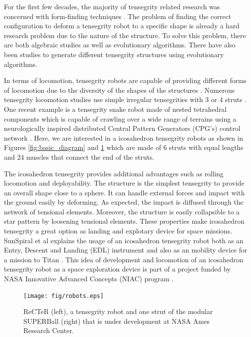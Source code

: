\documentclass[twocolumn,10pt]{asme2ej}
\begin{document}
For the first few decades, the majority of tensegrity related research was concerned with form-finding techniques \cite{Force_Density, Algebraic_form, Review_form_finding,Rieffel:2009:ADO:1507770.1507951, Nonregular_form_finding,Paul:2005:EFT:1068009.1068011,pugh1976introduction}.
The problem of finding the correct configuration to deform a tensegrity robot to a specific shape is already a hard research problem due to the nature of the structure. To solve this problem, there are both algebraic studies as well as evolutionary algorithms. There have also been studies to generate different tensegrity structures using evolutionary algorithms.

In terms of locomotion, tensegrity robots are capable of providing different forms of locomotion due to the diversity of the shapes of the structures \cite{fujiia2006movement}.  Numerous tensegrity locomotion studies use simple irregular tensegrities with 3 or 4 struts \cite{paul2006design,paul2005gait}.  One recent example is a tensegrity snake robot made of nested tetrahedral components which is capable of crawling over a wide range of terrains using a neurologically inspired distributed Central Pattern Generators (CPG's) control network \cite{Tietz2013}.  Here, we are interested in a icosahedron tensegrity robots as shown in Figures \ref{fig:basic_diagram} and \ref{fig:robots} which are made of 6 struts with equal lengths and 24 muscles that connect the end of the struts.

The icosahedron tensegrity provides additional advantages such as rolling locomotion and deployability. The structure is the simplest tensegrity to provide an overall shape close to a sphere. It can handle external forces and impact with the ground easily by deforming. As expected, the impact is diffused through the network of tensional elements. Moreover, the structure is easily collapsible to a star pattern by loosening tensional elements. These properties make icosahedron tensegrity a great option as landing and explotary device for space missions. SunSpiral et al explains the usage of an icosahedron tensegrity robot both as an Entry, Descent and Landing (EDL) instrument and also as an mobility device for a mission to Titan \cite{Vytas_IPPW_2013}. This idea of development and locomotion of an icosahedron tensegrity robot as a space exploration device is part of a project funded by NASA Innovative Advanced Concepts (NIAC) program \cite{NIACfinalreport}.

\begin{figure}[t]
   \centering
   \texttt{[image: fig/robots.eps]} 
   \caption{ReCTeR (left), a tensegrity robot and one strut of the modular SUPERBall (right) that is under development at NASA Ames Research Center.}
   \label{fig:robots}
\end{figure}
\end{document}
